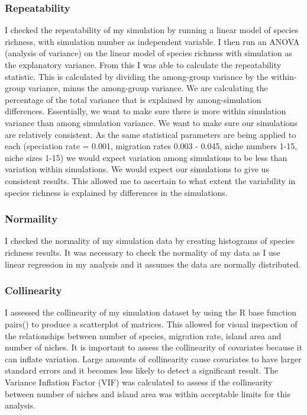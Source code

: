 \documentclass{article}
\begin{document}
\subsubsection{Repeatability}
I checked the repeatability of my simulation by running a linear model of species richness, with simulation number as independent variable. I then run an ANOVA (analysis of variance) on the linear model of species richness with simulation as the explanatory variance. From this I was able to calculate the repeatability statistic. This is calculated by dividing the among-group variance by the within-group variance, minus the among-group variance. We are calculating the percentage of the total variance that is explained by among-simulation differences. Essentially, we want to make sure there is more within simulation variance than among simulation variance. We want to make sure our simulations are relatively consistent. As the same statistical parameters are being applied to each (speciation rate = 0.001, migration rates 0.003 - 0.045, niche numbers 1-15, niche sizes 1-15) we would expect variation among simulations to be less than variation within simulations. We would expect our simulations to give us consistent results. This allowed me to ascertain to what extent the variability in species richness is explained by differences in the simulations.

\subsubsection{Normaility}
I checked the normality of my simulation data by creating histograms of species richness results. It was necessary to check the normality of my data as I use linear regression in my analysis and it assumes the data are normally distributed. 

\subsubsection{Collinearity}
I assessed the collinearity of my simulation dataset by using the R base function pairs() to produce a scatterplot of matrices. This allowed for visual inspection of the relationships between number of species, migration rate, island area and number of niches. It is important to assess the collinearity of covariates because it can inflate variation. Large amounts of collinearity cause covariates to have larger standard errors and it becomes less likely to detect a significant result. The Variance Inflation Factor (VIF) was calculated to assess if the collinearity between number of niches and island area was within acceptable limits for this analysis. 
\end{document}
